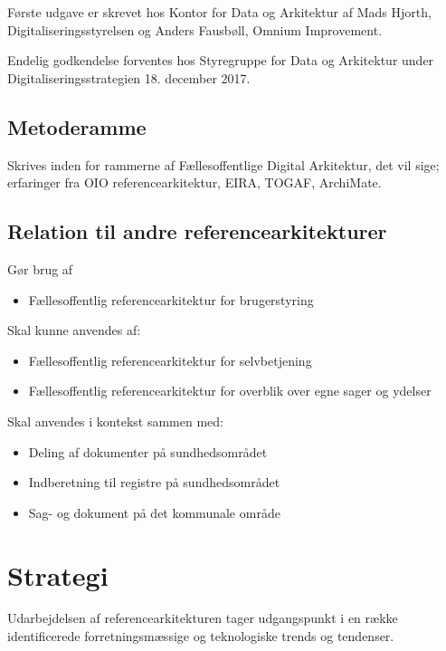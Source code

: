 Første udgave er skrevet hos Kontor for Data og Arkitektur af Mads
Hjorth, Digitaliseringsstyrelsen og Anders Fausbøll, Omnium Improvement.

Endelig godkendelse forventes hos Styregruppe for Data og Arkitektur
under Digitaliseringsstrategien 18. december 2017.

\subsection{Metoderamme}\label{metoderamme}

Skrives inden for rammerne af Fællesoffentlige Digital Arkitektur, det
vil sige; erfaringer fra OIO referencearkitektur, EIRA, TOGAF,
ArchiMate.

\subsection{Relation til andre
referencearkitekturer}\label{relation-til-andre-referencearkitekturer}

Gør brug af

\begin{itemize}
\tightlist
\item
  Fællesoffentlig referencearkitektur for brugerstyring
\end{itemize}

Skal kunne anvendes af:

\begin{itemize}
\tightlist
\item
  Fællesoffentlig referencearkitektur for selvbetjening
\item
  Fællesoffentlig referencearkitektur for overblik over egne sager og
  ydelser
\end{itemize}

Skal anvendes i kontekst sammen med:

\begin{itemize}
\tightlist
\item
  Deling af dokumenter på sundhedsområdet
\item
  Indberetning til registre på sundhedsområdet
\item
  Sag- og dokument på det kommunale område
\end{itemize}

\section{Strategi}\label{strategi}

Udarbejdelsen af referencearkitekturen tager udgangspunkt i en række
identificerede forretningsmæssige og teknologiske trends og tendenser.

